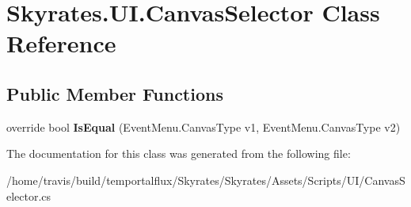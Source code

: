 \hypertarget{class_skyrates_1_1_u_i_1_1_canvas_selector}{\section{Skyrates.\-U\-I.\-Canvas\-Selector Class Reference}
\label{class_skyrates_1_1_u_i_1_1_canvas_selector}
}
\subsection*{Public Member Functions}
\begin{DoxyCompactItemize}
\item 
\hypertarget{class_skyrates_1_1_u_i_1_1_canvas_selector_a18ddf1cd3c6a2e54e6764094814c305f}{override bool {\bfseries Is\-Equal} (Event\-Menu.\-Canvas\-Type v1, Event\-Menu.\-Canvas\-Type v2)}\label{class_skyrates_1_1_u_i_1_1_canvas_selector_a18ddf1cd3c6a2e54e6764094814c305f}

\end{DoxyCompactItemize}


The documentation for this class was generated from the following file\-:\begin{DoxyCompactItemize}
\item 
/home/travis/build/temportalflux/\-Skyrates/\-Skyrates/\-Assets/\-Scripts/\-U\-I/Canvas\-Selector.\-cs\end{DoxyCompactItemize}
